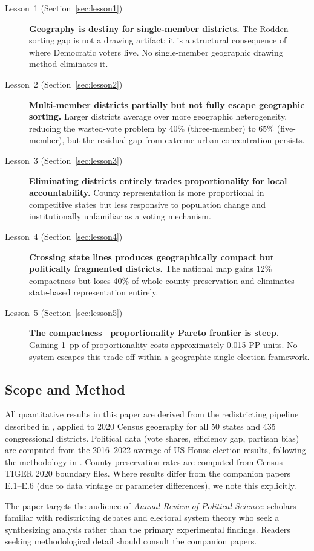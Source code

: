 \begin{description}
  \item[Lesson~1 (Section~\ref{sec:lesson1})] \textbf{Geography is destiny for
       single-member districts.}  The Rodden sorting gap \citep{rodden2019why}
       is not a drawing artifact; it is a structural consequence of where
       Democratic voters live.  No single-member geographic drawing method
       eliminates it.

  \item[Lesson~2 (Section~\ref{sec:lesson2})] \textbf{Multi-member districts
       partially but not fully escape geographic sorting.}  Larger districts
       average over more geographic heterogeneity, reducing the wasted-vote
       problem by 40\% (three-member) to 65\% (five-member), but the residual
       gap from extreme urban concentration persists.

  \item[Lesson~3 (Section~\ref{sec:lesson3})] \textbf{Eliminating districts
       entirely trades proportionality for local accountability.}  County
       representation is more proportional in competitive states but less
       responsive to population change and institutionally unfamiliar as a
       voting mechanism.

  \item[Lesson~4 (Section~\ref{sec:lesson4})] \textbf{Crossing state lines
       produces geographically compact but politically fragmented districts.}
       The national map gains 12\% compactness but loses 40\% of whole-county
       preservation and eliminates state-based representation entirely.

  \item[Lesson~5 (Section~\ref{sec:lesson5})] \textbf{The compactness--%
       proportionality Pareto frontier is steep.}  Gaining 1~pp of
       proportionality costs approximately 0.015 PP units.  No system escapes
       this trade-off within a geographic single-election framework.
\end{description}

\subsection{Scope and Method}

All quantitative results in this paper are derived from the redistricting
pipeline described in \citet{dellaLibera2026mec}, applied to 2020 Census
geography for all 50 states and 435 congressional districts.  Political data
(vote shares, efficiency gap, partisan bias) are computed from the 2016--2022
average of US House election results, following the methodology in
\citet{stephanopoulos2015partisan}.  County preservation rates are computed
from Census TIGER 2020 boundary files.  Where results differ from the
companion papers E.1--E.6 (due to data vintage or parameter differences),
we note this explicitly.

The paper targets the audience of \emph{Annual Review of Political Science}:
scholars familiar with redistricting debates and electoral system theory who
seek a synthesizing analysis rather than the primary experimental findings.
Readers seeking methodological detail should consult the companion papers.
